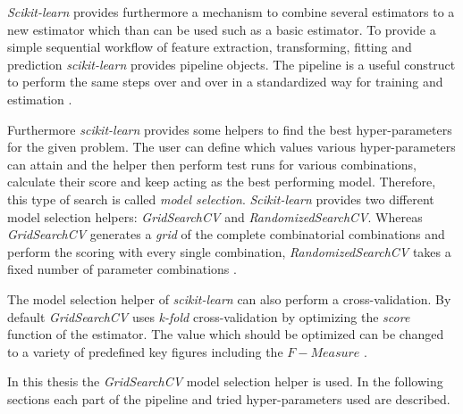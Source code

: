 \emph{Scikit-learn} provides furthermore a mechanism to combine several estimators to a new estimator which than can be used such as a basic estimator.
To provide a simple sequential workflow of feature extraction, transforming, fitting and prediction \emph{scikit-learn} provides pipeline objects.
The pipeline is a useful construct to perform the same steps over and over in a standardized way for training and estimation
\citep{buitinck2013api}.

Furthermore \emph{scikit-learn} provides some helpers to find the best hyper-parameters for the given problem.
The user can define which values various hyper-parameters can attain and the helper then perform test runs for various combinations, calculate their score and keep acting as the best performing model.
Therefore, this type of search is called \emph{model selection}.
\emph{Scikit-learn} provides two different model selection helpers: \emph{GridSearchCV} and \emph{RandomizedSearchCV}.
Whereas \emph{GridSearchCV} generates a \emph{grid} of the complete combinatorial combinations and perform the scoring with every single combination, \emph{RandomizedSearchCV} takes a fixed number of parameter combinations
\citep{buitinck2013api}.

The model selection helper of \emph{scikit-learn} can also perform a cross-validation.
By default \emph{GridSearchCV} uses \emph{k-fold} cross-validation by optimizing the \emph{score} function of the estimator.
The value which should be optimized can be changed to a variety of predefined key figures including the $F-Measure$
\citep{buitinck2013api}.

In this thesis the \emph{GridSearchCV} model selection helper is used. 
In the following sections each part of the pipeline and tried hyper-parameters used are described.

